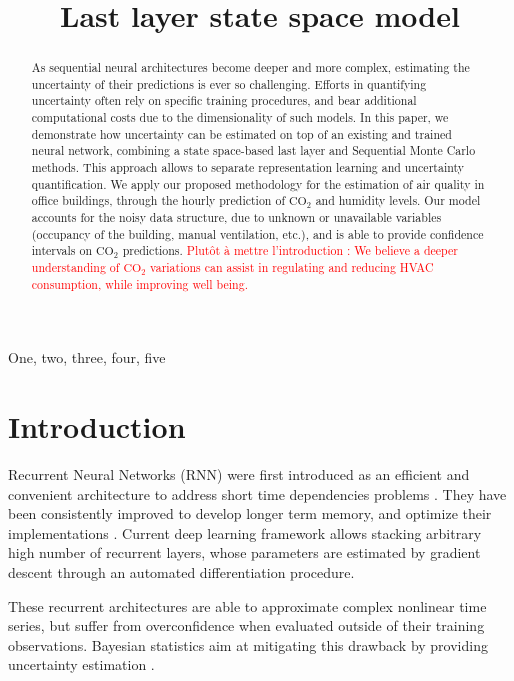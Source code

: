 \documentclass{article}
\title{Last layer state space model}
\begin{document}
\maketitle

\begin{abstract}
	As sequential neural architectures become deeper and more complex, estimating the uncertainty of their predictions is ever so challenging.
	Efforts in quantifying uncertainty often rely on specific training procedures, and bear additional computational costs due to the dimensionality of such models.
	In this paper, we demonstrate how uncertainty can be estimated on top of an existing and trained neural network, combining a state space-based last  layer and  Sequential Monte Carlo methods. This approach allows to separate representation learning and uncertainty quantification. We apply our proposed methodology for the estimation of air quality in office buildings, through the hourly prediction of \ensuremath{\mathrm{CO_2}} and humidity levels.
	Our model accounts for the noisy data structure, due to unknown or unavailable variables (occupancy of the building, manual ventilation, etc.), and is able to provide confidence intervals on \ensuremath{\mathrm{CO_2}} predictions.
	\textcolor{red}{Plutôt à mettre l'introduction :  We believe a deeper understanding of \ensuremath{\mathrm{CO_2}} variations can assist in regulating and reducing HVAC consumption, while improving well being.}
\end{abstract}

\begin{keywords}
	One, two, three, four, five
\end{keywords}

\section{Introduction}
\label{sec:intro}

Recurrent Neural Networks (RNN) were first introduced as an efficient and convenient architecture to address short time dependencies problems \cite{Mozer1989AFB}.
They have been consistently improved to develop longer term memory, and optimize their implementations \cite{Bengio1994LearningLD,Hochreiter1997LongSM,Cho2014LearningPR}.
Current deep learning framework allows stacking arbitrary high number of recurrent layers, whose parameters are estimated by gradient descent through an automated differentiation procedure.

These recurrent architectures are able to approximate complex nonlinear time series, but suffer from overconfidence when evaluated outside of their training observations. Bayesian statistics aim at mitigating this drawback by providing uncertainty estimation \cite{Hinton1995BayesianLF,MacKay1992}.
\end{document}
